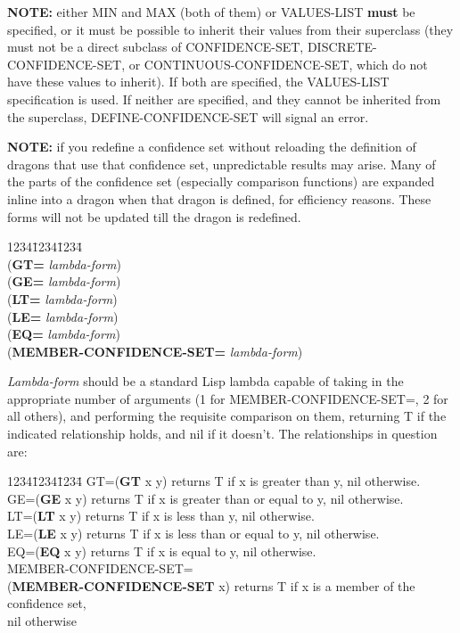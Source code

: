 {\bf NOTE:} either MIN and MAX (both of them) or VALUES-LIST {\bf
must} be specified, or it must be possible to inherit their values
from their superclass (they must not be a direct subclass of
CONFIDENCE-SET, DISCRETE-CONFIDENCE-SET, or CONTINUOUS-CONFIDENCE-SET,
which do not have these values to inherit). If both are specified, the
VALUES-LIST specification is used. If neither are specified, and they
cannot be inherited from the superclass, DEFINE-CONFIDENCE-SET will
signal an error.

{\bf NOTE:} if you redefine a confidence set without reloading the
definition of dragons that use that confidence set, unpredictable
results may arise. Many of the parts of the confidence set (especially
comparison functions) are expanded inline into a dragon when that
dragon is defined, for efficiency reasons. These forms will not be
updated till the dragon is redefined.

\begin{tabbing}
1234\=1234\=1234\= \kill
\\
({\bf GT=} {\it lambda-form}) \\
({\bf GE=} {\it lambda-form}) \\
({\bf LT=} {\it lambda-form}) \\
({\bf LE=} {\it lambda-form}) \\
({\bf EQ=} {\it lambda-form}) \\
({\bf MEMBER-CONFIDENCE-SET=} {\it lambda-form}) \\
\end{tabbing}
{\it Lambda-form} should be a standard Lisp lambda capable of taking in
the appropriate number of arguments (1 for MEMBER-CONFIDENCE-SET=, 2
for all others), and performing the requisite comparison on them,
returning T if the indicated relationship holds, and nil if it
doesn't. The relationships in question are:

\begin{tabbing}
1234\=1234\=1234\= \kill
\>GT=\>({\bf GT} x y) returns T if x is greater than y, nil otherwise.\\
\>GE=\>({\bf GE} x y) returns T if x is greater than or equal to y,
nil otherwise.\\ 
\>LT=\>({\bf LT} x y) returns T if x is less than y, nil otherwise.\\
\>LE=\>({\bf LE} x y) returns T if x is less than or equal to y, nil
otherwise. \\
\>EQ=\>({\bf EQ} x y) returns T if x is equal to y, nil otherwise. \\
\>MEMBER-CONFIDENCE-SET= \\
\>\>({\bf MEMBER-CONFIDENCE-SET} x) returns T if x is a member of the confidence set,\\
\>\>\>nil otherwise \\
\end{tabbing}

